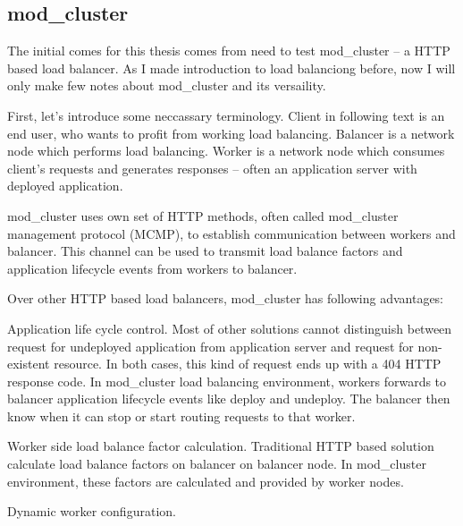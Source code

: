 \documentclass[
  master,
  biblatex,
  glossaries,
  index
]{kidiplom}
\begin{document}
\subsection{mod\_cluster}


The initial comes for this thesis comes from need to test mod\_cluster -- a HTTP based load balancer. As I made introduction to load balanciong before, now I will only make few notes about mod\_cluster and its versaility.

First, let's introduce some neccassary terminology. Client in following text is an end user, who wants to profit from working load balancing. Balancer is a network node which performs load balancing. Worker is a network node which consumes client's requests and generates responses -- often an application server with deployed application. %

mod\_cluster uses own set of HTTP methods, often called mod\_cluster management protocol (MCMP)\cite{bib:modcluster}, to establish communication between workers and balancer. This channel can be used to transmit load balance factors and application lifecycle events from workers to balancer.

Over other HTTP based load balancers, mod\_cluster has following advantages:

Application life cycle control. Most of other solutions cannot distinguish between request for undeployed application from application server and request for non-existent resource. In both cases, this kind of request ends up with a 404 HTTP response code. In mod\_cluster load balancing environment, workers forwards to balancer application lifecycle events like deploy and undeploy. The balancer then know when it can stop or start routing requests to that worker.\cite{bib:modcluster}

Worker side load balance factor calculation. Traditional HTTP based solution calculate load balance factors on balancer on balancer node. In mod\_cluster environment, these factors are calculated and provided by worker nodes.\cite{bib:modcluster}

Dynamic worker configuration. %
\end{document}
